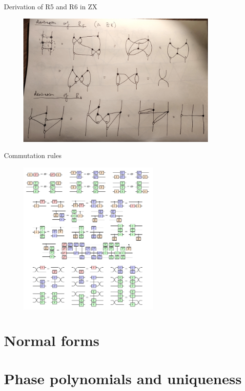 \documentclass{beamer}
\theoremstyle{definition}
\begin{document}
\begin{frame}{Derivation of R5 and R6 in ZX}

\begin{figure}
\includegraphics[width=10cm]{R5-R6}
\centering
\end{figure}
\end{frame}

\begin{frame}{Commutation rules}

\begin{figure}
\includegraphics[width=7cm]{commutation-rules}
\centering
\end{figure}
\end{frame}

\section{Normal forms}

\section{Phase polynomials and uniqueness}
\end{document}
